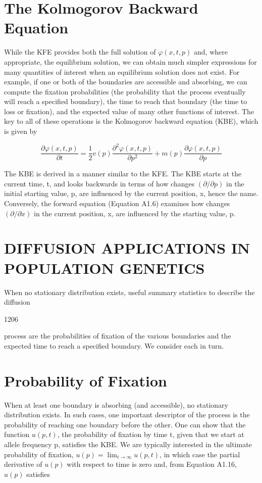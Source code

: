 \documentclass{article}
\begin{document}
\section{The Kolmogorov Backward Equation}
While the KFE provides both the full solution of  $ \varphi(x, t, p) $ and, where appropriate, the equilibrium solution, we can obtain much simpler expressions for many quantities of interest when an equilibrium solution does not exist. For example, if one or both of the boundaries are accessible and absorbing, we can compute the fixation probabilities (the probability that the process eventually will reach a specified boundary), the time to reach that boundary (the time to loss or fixation), and the expected value of many other functions of interest. The key to all of these operations is the Kolmogorov backward equation (KBE), which is given by

\begin{equation}
\frac{\partial\varphi(x,t,p)}{\partial t}=\frac{1}{2}v(p)\frac{\partial^{2}\varphi(x,t,p)}{\partial p^{2}}+m(p)\frac{\partial\varphi(x,t,p)}{\partial p}
\end{equation}

The KBE is derived in a manner similar to the KFE. The KBE starts at the current time, t, and looks backwards in terms of how changes  $ \left(\partial/\partial p\right) $ in the initial starting value, p, are influenced by the current position, x, hence the name. Conversely, the forward equation (Equation A1.6) examines how changes  $ \left(\partial/\partial x\right) $ in the current position, x, are influenced by the starting value, p.

\section{DIFFUSION APPLICATIONS IN POPULATION GENETICS}
When no stationary distribution exists, useful summary statistics to describe the diffusion

1206

process are the probabilities of fixation of the various boundaries and the expected time to reach a specified boundary. We consider each in turn.

\section{Probability of Fixation}
When at least one boundary is absorbing (and accessible), no stationary distribution exists. In such cases, one important descriptor of the process is the probability of reaching one boundary before the other. One can show that the function  $ u(p, t) $, the probability of fixation by time t, given that we start at allele frequency p, satisfies the KBE. We are typically interested in the ultimate probability of fixation,  $ u(p) = \lim_{t \to \infty} u(p, t) $, in which case the partial derivative of  $ u(p) $ with respect to time is zero and, from Equation A1.16,  $ u(p) $ satisfies
\end{document}
